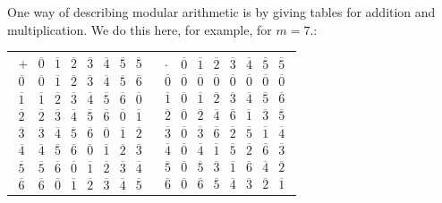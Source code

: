 One way of describing modular arithmetic is by giving tables for addition and
multiplication. We do this here, for example, for $m=7$.:
\begin{center}
\begin{tabular}{cc}
$\begin{array}{c|ccccccc}
+&\overline{0}&\overline{1}&\overline{2}&\overline{3}&\overline{4}&\overline{5}&\overline{5}\\
\hline
\overline{0}&\overline{0}&\overline{1}&\overline{2}&\overline{3}&\overline{4}&\overline{5}&\overline{6}\\
\overline{1}&\overline{1}&\overline{2}&\overline{3}&\overline{4}&\overline{5}&\overline{6}&\overline{0}\\
\overline{2}&\overline{2}&\overline{3}&\overline{4}&\overline{5}&\overline{6}&\overline{0}&\overline{1}\\
\overline{3}&\overline{3}&\overline{4}&\overline{5}&\overline{6}&\overline{0}&\overline{1}&\overline{2}\\
\overline{4}&\overline{4}&\overline{5}&\overline{6}&\overline{0}&\overline{1}&\overline{2}&\overline{3}\\
\overline{5}&\overline{5}&\overline{6}&\overline{0}&\overline{1}&\overline{2}&\overline{3}&\overline{4}\\
\overline{6}&\overline{6}&\overline{0}&\overline{1}&\overline{2}&\overline{3}&\overline{4}&\overline{5}
\end{array}$
&
$\begin{array}{c|ccccccc}
\cdot&\overline{0}&\overline{1}&\overline{2}&\overline{3}&\overline{4}&\overline{5}&\overline{5}\\
\hline
\overline{0}&\overline{0}&\overline{0}&\overline{0}&\overline{0}&\overline{0}&\overline{0}&\overline{0}\\
\overline{1}&\overline{0}&\overline{1}&\overline{2}&\overline{3}&\overline{4}&\overline{5}&\overline{6}\\
\overline{2}&\overline{0}&\overline{2}&\overline{4}&\overline{6}&\overline{1}&\overline{3}&\overline{5}\\
\overline{3}&\overline{0}&\overline{3}&\overline{6}&\overline{2}&\overline{5}&\overline{1}&\overline{4}\\
\overline{4}&\overline{0}&\overline{4}&\overline{1}&\overline{5}&\overline{2}&\overline{6}&\overline{3}\\
\overline{5}&\overline{0}&\overline{5}&\overline{3}&\overline{1}&\overline{6}&\overline{4}&\overline{2}\\
\overline{6}&\overline{0}&\overline{6}&\overline{5}&\overline{4}&\overline{3}&\overline{2}&\overline{1}
\end{array}$
\end{tabular}
\end{center}

